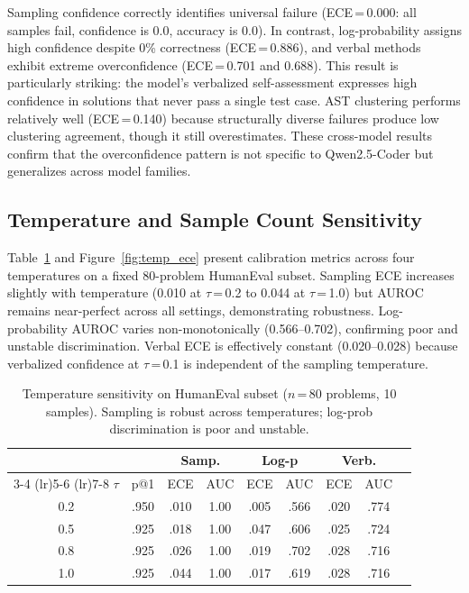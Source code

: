 \documentclass{article}
\begin{document}
Sampling confidence correctly identifies universal failure (ECE\,=\,0.000: all samples fail, confidence is 0.0, accuracy is 0.0). In contrast, log-probability assigns high confidence despite 0\% correctness (ECE\,=\,0.886), and verbal methods exhibit extreme overconfidence (ECE\,=\,0.701 and 0.688). This result is particularly striking: the model's verbalized self-assessment expresses high confidence in solutions that never pass a single test case. AST clustering performs relatively well (ECE\,=\,0.140) because structurally diverse failures produce low clustering agreement, though it still overestimates. These cross-model results confirm that the overconfidence pattern is not specific to Qwen2.5-Coder but generalizes across model families.

\subsection{Temperature and Sample Count Sensitivity}
\label{sec:sensitivity}

Table~\ref{tab:temperature} and Figure~\ref{fig:temp_ece} present calibration metrics across four temperatures on a fixed 80-problem HumanEval subset. Sampling ECE increases slightly with temperature (0.010 at $\tau$\,=\,0.2 to 0.044 at $\tau$\,=\,1.0) but AUROC remains near-perfect across all settings, demonstrating robustness. Log-probability AUROC varies non-monotonically (0.566--0.702), confirming poor and unstable discrimination. Verbal ECE is effectively constant (0.020--0.028) because verbalized confidence at $\tau$\,=\,0.1 is independent of the sampling temperature.

\begin{table}[t]
\centering
\caption{Temperature sensitivity on HumanEval subset ($n$\,=\,80 problems, 10 samples). Sampling is robust across temperatures; log-prob discrimination is poor and unstable.}
\label{tab:temperature}
\small
\setlength{\tabcolsep}{2pt}
\begin{tabular}{@{}ccccccccc@{}}
\toprule
& & \multicolumn{2}{c}{\textbf{Samp.}} & \multicolumn{2}{c}{\textbf{Log-p}} & \multicolumn{2}{c}{\textbf{Verb.}} \\
\cmidrule(lr){3-4} \cmidrule(lr){5-6} \cmidrule(lr){7-8}
$\tau$ & p@1 & ECE & AUC & ECE & AUC & ECE & AUC \\
\midrule
0.2 & .950 & .010 & 1.00 & .005 & .566 & .020 & .774 \\
0.5 & .925 & .018 & 1.00 & .047 & .606 & .025 & .724 \\
0.8 & .925 & .026 & 1.00 & .019 & .702 & .028 & .716 \\
1.0 & .925 & .044 & 1.00 & .017 & .619 & .028 & .716 \\
\bottomrule
\end{tabular}
\vspace{-0.5em}
\end{table}
\end{document}
